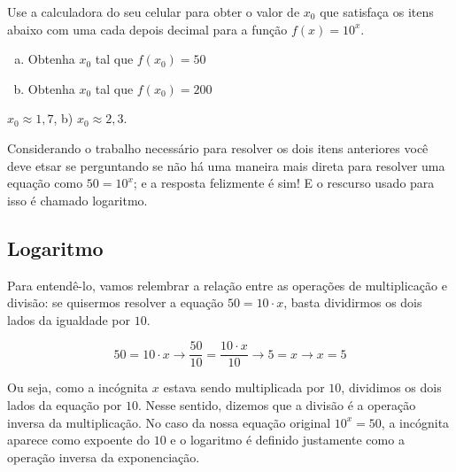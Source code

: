 \documentclass[main.tex]{subfiles}
\begin{document}
\begin{questao}
 Use a calculadora do seu celular para obter o valor de $x_0$ que satisfaça os itens abaixo com uma cada depois decimal para a função $f(x)=10^x$.
\begin{enumerate}[a)]
\item Obtenha $x_0$ tal que $f(x_0)=50$
\item Obtenha $x_0$ tal que $f(x_0)=200$
\end{enumerate}
\end{questao}

\begin{gabarito}
	\begin{gabaritoQuestao}
		$x_0 \approx 1,7$, b) $x_0 \approx 2,3$.
	\end{gabaritoQuestao}
\end{gabarito}


Considerando o trabalho necessário para resolver os dois itens anteriores você deve etsar se perguntando se não há uma maneira mais direta para resolver uma equação como $50=10^x$; e a resposta felizmente é sim! E o rescurso usado para isso é chamado logaritmo.

\subsection*{Logaritmo}

Para entendê-lo, vamos relembrar a relação entre as operações de multiplicação e divisão: se quisermos resolver a equação $50=10 \cdot x$, basta dividirmos os dois lados da igualdade por $10$.

$$
50=10 \cdot x \longrightarrow \frac{50}{10}=\frac{10 \cdot x}{10} \longrightarrow 5=x \longrightarrow x=5
$$

Ou seja, como a incógnita $x$ estava sendo multiplicada por $10$, dividimos os dois lados da equação por $10$. Nesse sentido, dizemos que a divisão é a operação inversa da multiplicação. No caso da nossa equação original $10^x=50$, a incógnita aparece como expoente do $10$ e o logaritmo é definido justamente como a operação inversa da exponenciação.
\end{document}
